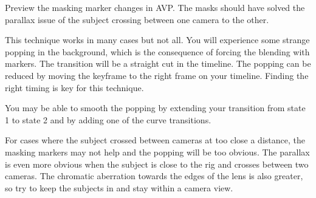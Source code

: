 \begin{fullwidth}

Preview the masking marker changes in AVP. The masks should have solved the parallax issue of the subject crossing between one camera to the other.

This technique works in many cases but not all. You will experience some strange popping in the background, which is the consequence of forcing the blending with markers. The transition will be a straight cut in the timeline. The popping can be reduced by moving the keyframe to the right frame on your timeline. Finding the right timing is key for this technique. 

\tip You may be able to smooth the popping by extending your transition from state 1 to state 2 and by adding one of the curve transitions.


For cases where the subject crossed between cameras at too close a distance, the masking markers may not help and the popping will be too obvious. The parallax is even more obvious when the subject is close to the rig and crosses between two cameras. The chromatic aberration towards the edges of the lens is also greater, so try to keep the subjects in \textbf{} and stay within a camera view.

\clearpage
\end{fullwidth}
